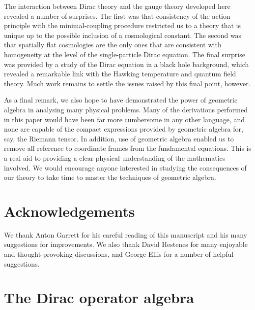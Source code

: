 \documentclass[a4paper]{article}
\numberwithin{equation}{section}
\begin{document}
The interaction between Dirac theory and the gauge theory developed
here revealed a number of surprises.  The first was that consistency
of the action principle with the minimal-coupling procedure restricted
us to a theory that is unique up to the possible inclusion of a
cosmological constant.  The second was that spatially flat cosmologies
are the only ones that are consistent with homogeneity at the level of
the single-particle Dirac equation.  The final surprise was provided
by a study of the Dirac equation in a black hole background, which
revealed a remarkable link with the Hawking temperature and quantum
field theory.  Much work remains to settle the issues raised by this
final point, however.


As a final remark, we also hope to have demonstrated the power of
geometric algebra in analysing many physical problems.  Many of the
derivations performed in this paper would have been far more
cumbersome in any other language, and none are capable of the compact
expressions provided by geometric algebra for, say, the Riemann
tensor.  In addition, use of geometric algebra enabled us to remove
all reference to coordinate frames from the fundamental equations.
This is a real aid to providing a clear physical understanding
of the mathematics involved.  We would encourage anyone interested in
studying the consequences of our theory to take time to master the
techniques of geometric algebra.



\section*{Acknowledgements}

We thank Anton Garrett for his careful reading of this manuscript and
his many suggestions for improvements.  We also thank David Hestenes
for many enjoyable and thought-provoking discussions, and George Ellis
for a number of helpful suggestions.    




\appendix

\section{The Dirac operator algebra} 
\label{app-dirac}
\end{document}
